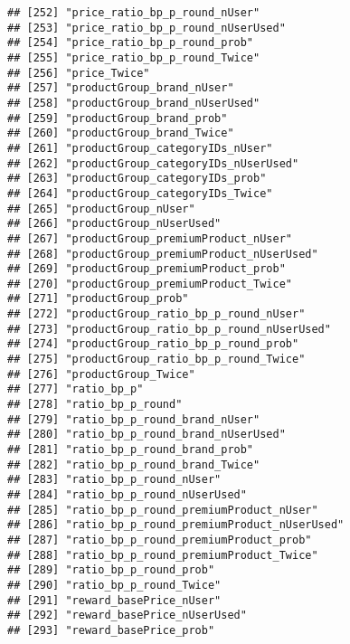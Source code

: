 \documentclass[10pt]{report}
\begin{document}
\begin{verbatim}
## [252] "price_ratio_bp_p_round_nUser"                       
## [253] "price_ratio_bp_p_round_nUserUsed"                   
## [254] "price_ratio_bp_p_round_prob"                        
## [255] "price_ratio_bp_p_round_Twice"                       
## [256] "price_Twice"                                        
## [257] "productGroup_brand_nUser"                           
## [258] "productGroup_brand_nUserUsed"                       
## [259] "productGroup_brand_prob"                            
## [260] "productGroup_brand_Twice"                           
## [261] "productGroup_categoryIDs_nUser"                     
## [262] "productGroup_categoryIDs_nUserUsed"                 
## [263] "productGroup_categoryIDs_prob"                      
## [264] "productGroup_categoryIDs_Twice"                     
## [265] "productGroup_nUser"                                 
## [266] "productGroup_nUserUsed"                             
## [267] "productGroup_premiumProduct_nUser"                  
## [268] "productGroup_premiumProduct_nUserUsed"              
## [269] "productGroup_premiumProduct_prob"                   
## [270] "productGroup_premiumProduct_Twice"                  
## [271] "productGroup_prob"                                  
## [272] "productGroup_ratio_bp_p_round_nUser"                
## [273] "productGroup_ratio_bp_p_round_nUserUsed"            
## [274] "productGroup_ratio_bp_p_round_prob"                 
## [275] "productGroup_ratio_bp_p_round_Twice"                
## [276] "productGroup_Twice"                                 
## [277] "ratio_bp_p"                                         
## [278] "ratio_bp_p_round"                                   
## [279] "ratio_bp_p_round_brand_nUser"                       
## [280] "ratio_bp_p_round_brand_nUserUsed"                   
## [281] "ratio_bp_p_round_brand_prob"                        
## [282] "ratio_bp_p_round_brand_Twice"                       
## [283] "ratio_bp_p_round_nUser"                             
## [284] "ratio_bp_p_round_nUserUsed"                         
## [285] "ratio_bp_p_round_premiumProduct_nUser"              
## [286] "ratio_bp_p_round_premiumProduct_nUserUsed"          
## [287] "ratio_bp_p_round_premiumProduct_prob"               
## [288] "ratio_bp_p_round_premiumProduct_Twice"              
## [289] "ratio_bp_p_round_prob"                              
## [290] "ratio_bp_p_round_Twice"                             
## [291] "reward_basePrice_nUser"                             
## [292] "reward_basePrice_nUserUsed"                         
## [293] "reward_basePrice_prob"                              

\end{verbatim}
\end{document}
